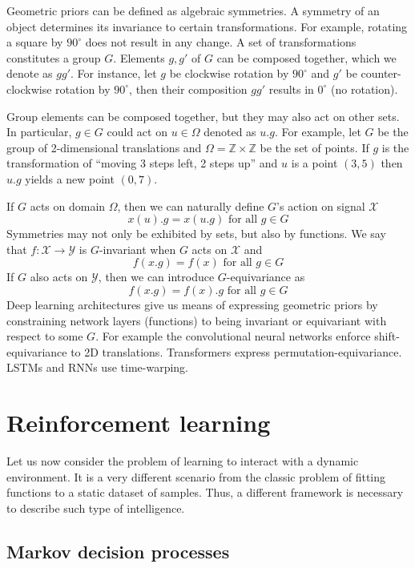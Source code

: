 \documentclass[oneside,english,logo]{amuthesis}
\begin{document}
Geometric priors can be defined as algebraic symmetries. A symmetry of an object determines its invariance to certain transformations. For example, rotating a square by $90^\circ$ does not result in any change. A set of transformations constitutes a group $G$. Elements $g,g'$ of $G$ can be composed together, which we denote as $gg'$. For instance, let $g$ be clockwise rotation by $90^\circ$ and $g'$ be counter-clockwise rotation by $90^\circ$, then their composition $gg'$ results in $0^\circ$ (no rotation). 

Group elements can be composed together, but they may also act on other sets. In particular, $g\in G$ could act on $u\in \Omega$ denoted as $u.g$. For example, let $G$ be the group of 2-dimensional translations and $\Omega=\mathbb{Z} \times \mathbb{Z}$ be the set of points. If $g$ is the transformation of ``moving 3 steps left, 2 steps up'' and $u$ is a point $(3,5)$ then $u.g$ yields a new point $(0,7)$.

If $G$ acts on domain $\Omega$, then we can naturally define $G$'s action on signal $\mathcal{X}$
\[
x(u).g = x(u.g)\text{ for all }g\in G
\]
Symmetries may not only be exhibited by sets, but also by functions. We say that $f:\mathcal{X}\rightarrow\mathcal{Y}$ is $G$-invariant when $G$ acts on $\mathcal{X}$ and 
\[
f(x.g) = f(x)\text{ for all }g\in G
\]
If $G$ also acts on $\mathcal{Y}$, then we can introduce  $G$-equivariance as
\[
f(x.g) = f(x).g \text{ for all }g\in G
\]  
Deep learning architectures give us means of expressing geometric priors by constraining network layers (functions) to being invariant or equivariant with respect to some $G$. For example the convolutional neural networks enforce shift-equivariance to 2D translations. Transformers express permutation-equivariance. LSTMs and RNNs use time-warping.


\section{Reinforcement learning}

Let us now consider  the problem of learning to interact with a dynamic environment. It is a very different scenario from the classic problem of fitting functions to a static dataset of samples. Thus, a different framework is necessary to describe such type of intelligence.

\subsection{Markov decision processes}
\end{document}
